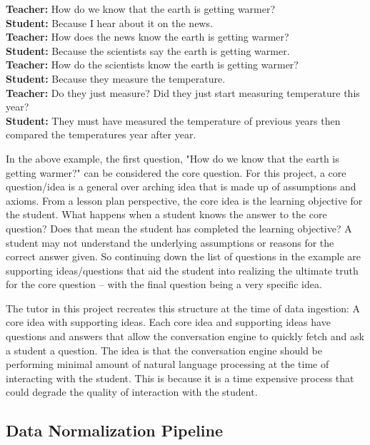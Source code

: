 \documentclass{sigchi}
\begin{document}
  \begin{addmargin}[1em]{2em}
    \textbf{Teacher:} How do we know that the earth is getting warmer? \\ 
    \textbf{Student:} Because I hear about it on the news. \\
    \textbf{Teacher:} How does the news know the earth is getting warmer? \\
    \textbf{Student:} Because the scientists say the earth is getting warmer. \\
    \textbf{Teacher:} How do the scientists know the earth is getting warmer? \\
    \textbf{Student:} Because they measure the temperature. \\
    \textbf{Teacher:} Do they just measure? Did they just start measuring temperature this year? \\
    \textbf{Student:} They must have measured the temperature of previous years then compared the temperatures year after year. \\
  \end{addmargin}

  In the above example, the first question, "How do we know that the earth is getting warmer?" can be considered the core question. For this project, a core question/idea is a general over arching idea that is made up of assumptions and axioms. From a lesson plan perspective, the core idea is the learning objective for the student. What happens when a student knows the answer to the core question? Does that mean the student has completed the learning objective? A student may not understand the underlying assumptions or reasons for the correct answer given. So continuing down the list of questions in the example are supporting ideas/questions that aid the student into realizing the ultimate truth for the core question -- with the final question being a very specific idea.
  
  The tutor in this project recreates this structure at the time of data ingestion: A core idea with supporting ideas. Each core idea and supporting ideas have questions and answers that allow the conversation engine to quickly fetch and ask a student a question. The idea is that the conversation engine should be performing minimal amount of natural language processing at the time of interacting with the student. This is because it is a time expensive process that could degrade the quality of interaction with the student.

  \subsection{Data Normalization Pipeline}
\end{document}
